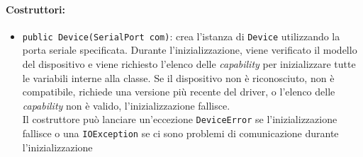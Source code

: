 \paragraph{Costruttori:}\begin{itemize}
	\item \texttt{public Device(SerialPort com)}: crea l'istanza di \texttt{Device} utilizzando la porta seriale specificata. Durante l'inizializzazione, viene verificato il modello del dispositivo e viene richiesto l'elenco delle \textit{capability} per inizializzare tutte le variabili interne alla classe. Se il dispositivo non è riconosciuto, non è compatibile, richiede una versione più recente del driver, o l'elenco delle \textit{capability} non è valido, l'inizializzazione fallisce.\\
	Il costruttore può lanciare un'eccezione \texttt{DeviceError} se l'inizializzazione fallisce o una \texttt{IOException} se ci sono problemi di comunicazione durante l'inizializzazione
\end{itemize}

